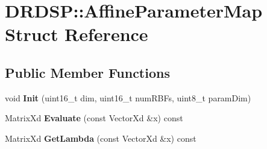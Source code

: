 \hypertarget{struct_d_r_d_s_p_1_1_affine_parameter_map}{\section{D\-R\-D\-S\-P\-:\-:Affine\-Parameter\-Map Struct Reference}
\label{struct_d_r_d_s_p_1_1_affine_parameter_map}
}
\subsection*{Public Member Functions}
\begin{DoxyCompactItemize}
\item 
\hypertarget{struct_d_r_d_s_p_1_1_affine_parameter_map_a56991113d3a808ed701b1d1e10ebb3e0}{void {\bfseries Init} (uint16\-\_\-t dim, uint16\-\_\-t num\-R\-B\-Fs, uint8\-\_\-t param\-Dim)}\label{struct_d_r_d_s_p_1_1_affine_parameter_map_a56991113d3a808ed701b1d1e10ebb3e0}

\item 
\hypertarget{struct_d_r_d_s_p_1_1_affine_parameter_map_a1d177c7c644e587969c3c751828c1181}{Matrix\-Xd {\bfseries Evaluate} (const Vector\-Xd \&x) const }\label{struct_d_r_d_s_p_1_1_affine_parameter_map_a1d177c7c644e587969c3c751828c1181}

\item 
\hypertarget{struct_d_r_d_s_p_1_1_affine_parameter_map_a01b509358863e765d181ce5d7e9e6326}{Matrix\-Xd {\bfseries Get\-Lambda} (const Vector\-Xd \&x) const }\label{struct_d_r_d_s_p_1_1_affine_parameter_map_a01b509358863e765d181ce5d7e9e6326}

\end{DoxyCompactItemize}
